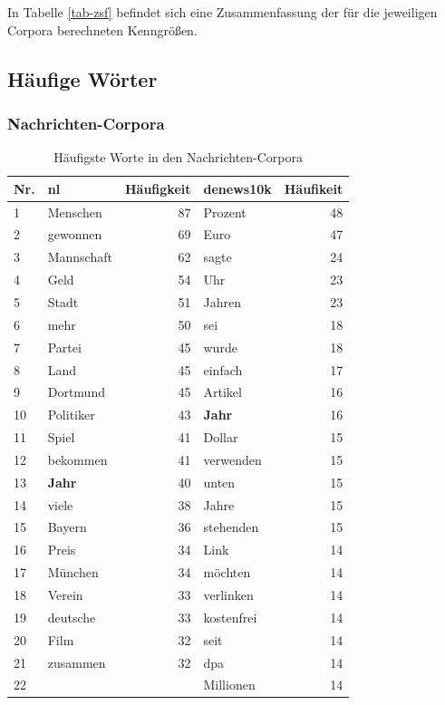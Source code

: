 \documentclass[11pt, a4paper]{article}
\begin{document}
In Tabelle \ref{tab-zsf} befindet sich eine Zusammenfassung der für die
jeweiligen Corpora berechneten Kenngrößen.


\subsection{H\"aufige W\"orter}

\subsubsection{Nachrichten-Corpora}

\begin{table}
    \begin{tabular}{l*{2}{lr}}
    \toprule
    Nr. & nl & Häufigkeit & denews10k & Häufikeit\\
    \midrule
    1  & Menschen    & 87 &  Prozent     & 48 \\
    2  & gewonnen    & 69 &  Euro        & 47 \\
    3  & Mannschaft  & 62 &  sagte       & 24 \\
    4  & Geld        & 54 &  Uhr         & 23 \\
    5  & Stadt       & 51 &  Jahren      & 23 \\
    6  & mehr        & 50 &  sei         & 18 \\
    7  & Partei      & 45 &  wurde       & 18 \\
    8  & Land        & 45 &  einfach     & 17 \\
    9  & Dortmund    & 45 &  Artikel     & 16 \\
    10 & Politiker   & 43 &  \textbf{Jahr}        & 16 \\
    11 & Spiel       & 41 &  Dollar      & 15 \\
    12 & bekommen    & 41 &  verwenden   & 15 \\
    13 & \textbf{Jahr}        & 40 &  unten       & 15 \\
    14 & viele       & 38 &  Jahre       & 15 \\
    15 & Bayern      & 36 &  stehenden   & 15 \\
    16 & Preis       & 34 &  Link        & 14 \\
    17 & München     & 34 &  möchten     & 14 \\
    18 & Verein      & 33 &  verlinken   & 14 \\
    19 & deutsche    & 33 &  kostenfrei  & 14 \\
    20 & Film        & 32 &  seit        & 14 \\
    21 & zusammen    & 32 &  dpa         & 14 \\
    22 &             &    &  Millionen   & 14 \\
    \bottomrule
    \end{tabular}
    \caption{Häufigste Worte in den Nachrichten-Corpora}
    \label{words-nachrichten}
\end{table}
\end{document}
